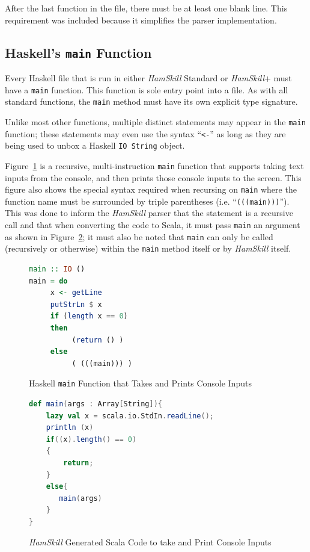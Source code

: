 \documentclass{report}
\begin{document}
After the last function in the file, there must be at least one blank line.  This requirement was included because it simplifies the parser implementation.

\subsection{Haskell's \texttt{main} Function}\label{sec:mainFunction}

Every Haskell file that is run in either \textit{HamSkill} Standard or \textit{HamSkill}+ must have a \texttt{main} function.  This function is sole entry point into a file.  As with all standard functions, the \texttt{main} method must have its own explicit type signature.

Unlike most other functions, multiple distinct statements may appear in the \texttt{main} function; these statements may even use the syntax ``\texttt{<-}'' as long as they are being used to unbox a Haskell \texttt{IO String} object.

Figure~\ref{fig:functionHaskellMainConsoleInput} is a recursive, multi-instruction \texttt{main} function that supports taking text inputs from the console, and then prints those console inputs to the screen.  This figure also shows the special syntax required when recursing on \texttt{main} where the function name must be surrounded by triple parentheses (i.e. ``\texttt{(((main)))}'').  This was done to inform the \textit{HamSkill} parser that the statement is a recursive call and that when converting the code to Scala, it must pass \texttt{main} an argument as shown in Figure~\ref{fig:functionScalaMainConsoleInput}; it must also be noted that \texttt{main} can only be called (recursively or otherwise) within the \texttt{main} method itself or by \textit{HamSkill} itself.

\begin{figure}[H]
\begin{mdframed}
\begin{lstlisting}[language=Haskell]
main :: IO ()
main = do 
     x <- getLine 
     putStrLn $ x
     if (length x == 0) 
     then 
          (return () )
     else
          ( (((main))) )
\end{lstlisting}
\end{mdframed}
\caption{Haskell \texttt{main} Function that Takes and Prints Console Inputs}\label{fig:functionHaskellMainConsoleInput}
\end{figure}

\begin{figure}[H]
\begin{mdframed}
\begin{lstlisting}[language=scala]
def main(args : Array[String]){
    lazy val x = scala.io.StdIn.readLine();
    println (x)
    if((x).length() == 0)
    {
        return;
    }
    else{
       main(args)
    }
}
\end{lstlisting}
\end{mdframed}
\caption{\textit{HamSkill} Generated Scala Code to take and Print Console Inputs}\label{fig:functionScalaMainConsoleInput}
\end{figure}
\end{document}
